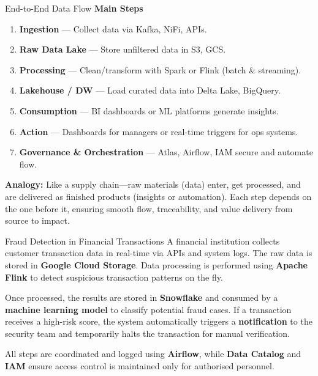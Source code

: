 \documentclass[aspectratio=169, table]{beamer}
\begin{document}
	\begin{frame}[fragile]{End-to-End Data Flow}
		\vspace{20pt}
		\textbf{Main Steps}
		\begin{enumerate}
			\item \textbf{Ingestion} — Collect data via Kafka, NiFi, APIs.
			\item \textbf{Raw Data Lake} — Store unfiltered data in S3, GCS.
			\item \textbf{Processing} — Clean\slash transform with Spark or Flink (batch \& streaming).
			\item \textbf{Lakehouse / DW} — Load curated data into Delta Lake, BigQuery.
			\item \textbf{Consumption} — BI dashboards or ML platforms generate insights.
			\item \textbf{Action} — Dashboards for managers or real-time triggers for ops systems.
			\item \textbf{Governance \& Orchestration} — Atlas, Airflow, IAM secure and automate flow.
		\end{enumerate}
		
		\vspace{10pt}
		\textbf{Analogy:} Like a supply chain—raw materials (data) enter, get processed, and are delivered as finished products (insights or automation). Each step depends on the one before it, ensuring smooth flow, traceability, and value delivery from source to impact.
	\end{frame}
	
	
\begin{frame}[fragile]{Fraud Detection in Financial Transactions}
	\vspace{10pt}
	A financial institution collects customer transaction data in real-time via APIs and system logs. The raw data is stored in \textbf{Google Cloud Storage}. Data processing is performed using \textbf{Apache Flink} to detect suspicious transaction patterns on the fly.
	
	\vspace{10pt}
	Once processed, the results are stored in \textbf{Snowflake} and consumed by a \textbf{machine learning model} to classify potential fraud cases. If a transaction receives a high-risk score, the system automatically triggers a \textbf{notification} to the security team and temporarily halts the transaction for manual verification.
	
	\vspace{10pt}
	All steps are coordinated and logged using \textbf{Airflow}, while \textbf{Data Catalog} and \textbf{IAM} ensure access control is maintained only for authorised personnel.
\end{frame}
\end{document}
